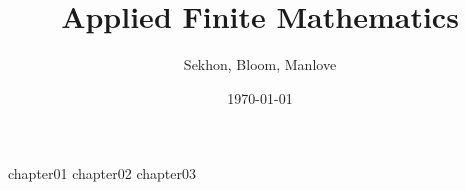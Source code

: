 \documentclass[12pt]{book}
\begin{document}

\frontmatter
\title{Applied Finite Mathematics}
\author{Sekhon, Bloom, Manlove}
\date{\today}
\maketitle
\tableofcontents

\mainmatter
{chapter01}
{chapter02}
{chapter03}


\backmatter
\end{document}
